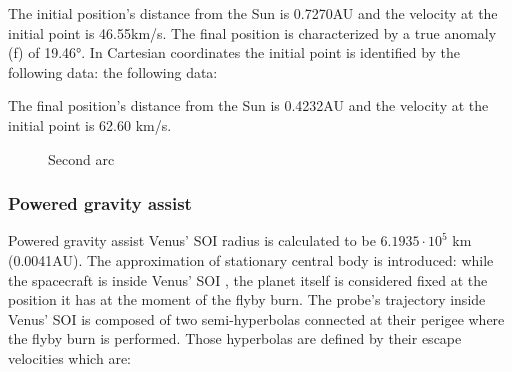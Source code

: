 \documentclass[11pt,a4paper]{report}
\begin{document}
The initial position’s distance from the Sun is 0.7270AU and the velocity at the initial point is 46.55km/s.
The final position is characterized by a true anomaly (f) of 19.46°. In Cartesian coordinates the initial point is identified by the following data:
the following data:

\begin{table}[H]
\centering
{}
\end{table}
The final position’s distance from the Sun is 0.4232AU and the velocity at the initial point is 62.60 km/s.

\begin{figure}[H]
\centering
{}
    \caption{Second arc}
\end{figure}


\subsubsection{Powered gravity assist}

Powered gravity assist
Venus’ SOI radius is calculated to be $6.1935\cdot10^{5}$ km (0.0041AU).
The approximation of stationary central body is introduced: while the spacecraft is inside Venus’ SOI , the planet itself is considered fixed at the position it has at the moment of the flyby burn.
The probe’s trajectory inside Venus’ SOI is composed of two semi-hyperbolas connected at their perigee where the flyby burn is performed. Those hyperbolas are defined by their escape velocities which are:

\begin{table}[H]
\centering
{}
\end{table}
\end{document}
